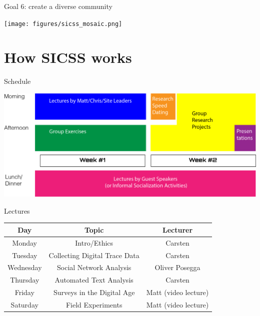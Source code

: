 \documentclass{beamer}
\begin{document}
\begin{frame}{Goal 6: create a diverse community}

\begin{center}
\texttt{[image: figures/sicss\_mosaic.png]}
\end{center}

\end{frame}

\section{How SICSS works}

\begin{frame}{Schedule}

\begin{center}
\includegraphics[width=1.0\textwidth]{figures/SICSSAnatomy.png}
\end{center}

\end{frame}


\begin{frame}{Lectures}

\begin{center}
\begin{tabular}{ c|c|c } 
\hline
\textbf{Day} & \textbf{Topic} & \textbf{Lecturer} \\
\hline
Monday & Intro/Ethics & Carsten \\ 
Tuesday & Collecting Digital Trace Data & Carsten \\ 
Wednesday & Social Network Analysis & Oliver Posegga\\ 
Thursday & Automated Text Analysis & Carsten \\ 
Friday & Surveys in the Digital Age & Matt (video lecture)\\ 
Saturday & Field Experiments & Matt (video lecture)\\ 

\hline
\end{tabular}
\end{center}

\end{frame}
\end{document}
